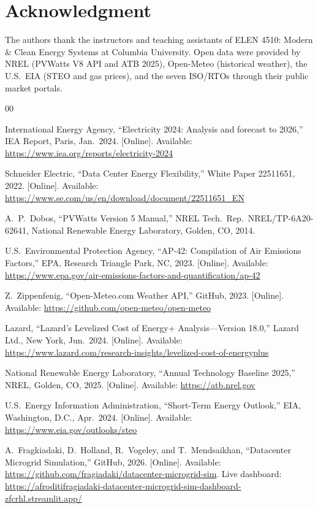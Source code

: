 \documentclass[conference]{IEEEtran}
\begin{document}
\section*{Acknowledgment}

The authors thank the instructors and teaching assistants of ELEN 4510:
Modern \& Clean Energy Systems at Columbia University.
Open data were provided by NREL (PVWatts V8 API and ATB 2025), Open-Meteo
(historical weather), the U.S.\ EIA (STEO and gas prices), and the seven
ISO/RTOs through their public market portals.

\begin{thebibliography}{00}

International Energy Agency, ``Electricity 2024: Analysis and forecast to
2026,'' IEA Report, Paris, Jan.\ 2024. [Online]. Available:
\url{https://www.iea.org/reports/electricity-2024}

Schneider Electric, ``Data Center Energy Flexibility,'' White Paper
22511651, 2022. [Online]. Available:
\url{https://www.se.com/us/en/download/document/22511651_EN}

A.\ P.\ Dobos, ``PVWatts Version 5 Manual,'' NREL Tech.\ Rep.\
NREL/TP-6A20-62641, National Renewable Energy Laboratory, Golden, CO,
2014.

U.S.\ Environmental Protection Agency, ``AP-42: Compilation of Air
Emissions Factors,'' EPA, Research Triangle Park, NC, 2023. [Online].
Available: \url{https://www.epa.gov/air-emissions-factors-and-quantification/ap-42}

Z.\ Zippenfenig, ``Open-Meteo.com Weather API,'' GitHub, 2023. [Online].
Available: \url{https://github.com/open-meteo/open-meteo}

Lazard, ``Lazard's Levelized Cost of Energy+ Analysis---Version 18.0,''
Lazard Ltd., New York, Jun.\ 2024. [Online]. Available:
\url{https://www.lazard.com/research-insights/levelized-cost-of-energyplus}

National Renewable Energy Laboratory, ``Annual Technology Baseline 2025,''
NREL, Golden, CO, 2025. [Online]. Available: \url{https://atb.nrel.gov}

U.S.\ Energy Information Administration, ``Short-Term Energy Outlook,''
EIA, Washington, D.C., Apr.\ 2024. [Online]. Available:
\url{https://www.eia.gov/outlooks/steo}

A.\ Fragkiadaki, D.\ Holland, R.\ Vogeley, and T.\ Mendsaikhan,
``Datacenter Microgrid Simulation,'' GitHub, 2026. [Online]. Available:
\url{https://github.com/fragiadaki/datacenter-microgrid-sim}.
Live dashboard: \url{https://afroditifragiadaki-datacenter-microgrid-sim-dashboard-zfcrhl.streamlit.app/}

\end{thebibliography}
\end{document}
